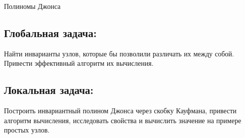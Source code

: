 \documentclass[a4paper,8pt]{extarticle}
\begin{document}
\begin{center}
    \Huge Полиномы Джонса
\end{center}
\begin{multicols}{2}
\subsection*{Глобальная задача:}
Найти инварианты узлов, которые бы позволили различать их между собой. Привести эффективный алгоритм их вычисления.

\columnbreak
\subsection*{Локальная задача:}
Построить инвариантный полином Джонса через скобку Кауфмана, привести алгоритм вычисления, исследовать свойства и вычислить значение на примере простых узлов.
\end{multicols}
\end{document}
